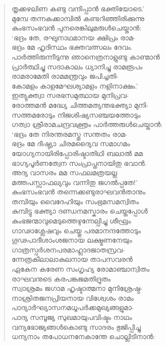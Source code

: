 \begin{verse}
തൃക്കഴലിണ കണ്ടു വന്ദിപ്പാന്‍ ഭക്തിയോടെ.’\\
മുമ്പേ തന്നകക്കാമ്പില്‍ കണ്ടറിഞ്ഞിരിക്കുന്നു\\
കുംഭസംഭവന്‍ പുനരെങ്കിലുമരുള്‍ചെയ്താന്‍:\\
‘ഭദ്രം തേ, രഘുനാഥമാനയ ക്ഷിപ്രം രാമ-\\
ഭദ്രം മേ ഹൃദിസ്ഥം ഭക്തവത്സലം ദേവം.\\
പാര്‍ത്തിരുന്നീടുന്നു ഞാനെത്രനാളുണ്ടു കാണ്മാന്‍\\
പ്രാര്‍ത്ഥിച്ചു സദാകാലം ധ്യാനിച്ചു രാമരൂപം\\
രാമരാമേതി രാമമന്ത്രവും ജപിച്ചതി-\\
കോമളം കാളമേഘശ്യാമളം നളിനാക്ഷം.’\\
ഇത്യുക്ത്വാ സരഭസമുത്ഥായ മുനിപ്രവ-\\
രോത്തമന്‍ മദ്ധ്യേ ചിത്തമത്യന്തഭക്ത്യാ മുനി-\\
സത്തമരോടും നിജശിഷ്യസഞ്ചയത്തോടും\\
ഗത്വാ ശ്രീരാമചന്ദ്രവക്ത്രം പാര്‍ത്തരുള്‍ചെയ്താന്‍:\\
‘ഭദ്രം തേ നിരന്തരമസ്തു സന്തതം രാമ-\\
ഭദ്രം മേ ദിഷ്ട്യാ ചിരമദ്യൈവ സമാഗമം\\
യോഗ്യനായിരിപ്പോരിഷ്ടാതിഥി ബലാല്‍ മമ\\
ഭാഗ്യപൂര്‍ണത്വേന സംപ്രാപ്തനായിതു ഭവാന്‍.\\
അദ്യ വാസരം മമ സഫലമത്രയല്ല\\
മത്തപസ്സാഫല്യവും വന്നിതു ജഗല്‍പ്പതേ!’\\
കുംഭസംഭവന്‍ തന്നെക്കണ്ടുരാഘവന്‍താനും\\
തമ്പിയും വൈദേഹിയും സംഭ്രമസമന്വിതം\\
കുമ്പിട്ടു ഭക്ത്യാ ദണ്ഡനമസ്കാരം ചെയ്തപ്പോള്‍\\
കുംഭജന്മാവുമെടുത്തെഴുന്നേല്പിച്ചു ശീഘ്രം\\
ഗാഢാശ്ലേഷവും ചെയ്തു പരമാനന്ദത്തോടും\\
ഗൂഢപാദീശാംശജനായ ലക്ഷ്മണനേയും\\
ഗാത്രസ്പര്‍ശനപരമാഹ്ലാദജാതസ്രവ-\\
ന്നേത്രകീലാലാകുലനായ താപസവരന്‍\\
ഏകേന കരേണ സംഗൃഹ്യ രോമാഞ്ചാന്വിതം\\
രാഘവനുടെ കരപങ്കജമതിദ്രുതം\\
സ്വാശ്രമം ജഗാമ ഹൃഷ്ടാത്മനാ മുനിശ്രേഷ്ഠ-\\
നാശ്രിതജനപ്രിയനായ വിശ്വേശം രാമം\\
പാദ്യാര്‍ഘ്യാസനമധൂപര്‍ക്കമുഖ്യങ്ങളുമാ-\\
പാദ്യ സമ്പൂജ്യ സുഖമായുപവിഷ്ടം നാഥം\\
വന്യഭോജ്യങ്ങള്‍കൊണ്ടു സാദരം ഭുജിപ്പിച്ചു\\
ധന്യനാം തപോധനനേകാന്തേ ചൊല്ലിടിനാന്‍:
\end{verse}

